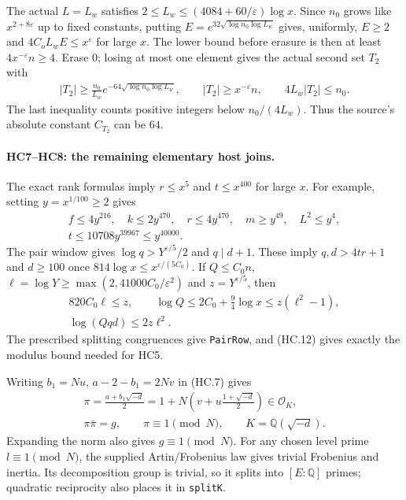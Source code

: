 The actual $L=L_w$ satisfies
$2\le L_w\le(4084+60/\varepsilon)\log x$.
Since $n_0$ grows like $x^{2+8\varepsilon}$ up to fixed constants,
putting $E=e^{32\sqrt{\log n_0\log L_w}}$ gives, uniformly,
$E\ge2$ and $4C_oL_wE\le x^\varepsilon$ for large $x$.
The lower bound before erasure is then at least
$4x^{-\varepsilon}n\ge4$. Erase $0$; losing at most one element
gives the actual second set $T_2$ with
\[
 \begin{gathered}
 |T_2|\ge\frac{n_0}{L_w}
       e^{-64\sqrt{\log n_0\log L_w}},\qquad
 |T_2|\ge x^{-\varepsilon}n,\qquad
 4L_w|T_2|\le n_0.
 \end{gathered}                                      \tag{HC.11}
\]
The last inequality counts positive integers below $n_0/(4L_w)$.
Thus the source's absolute constant $C_{T_2}$ can be $64$.

\paragraph{HC7--HC8: the remaining elementary host joins.}
The exact rank formulas imply $r\le x^5$ and $t\le x^{400}$
for large $x$. For example, setting $y=x^{1/100}\ge2$ gives
\[
 \begin{gathered}
 f\le4y^{216},\quad k\le2y^{470},\quad r\le4y^{470},
 \quad m\ge y^{49},\quad L^2\le y^4,\\
 t\le10708y^{39967}\le y^{40000}.
 \end{gathered}
\]
The pair window gives $\log q>Y^{\varepsilon/5}/2$ and $q\mid d+1$.
These imply $q,d>4tr+1$ and $d\ge100$ once
$814\log x\le x^{\varepsilon/(5C_0)}$.
If $Q\le C_0n$, $\ell=\log Y\ge\max(2,41000C_0/\varepsilon^2)$
and $z=Y^{\varepsilon/5}$, then
\[
 \begin{gathered}
 820C_0\ell\le z,\qquad
 \log Q\le2C_0+\tfrac94\log x\le z(\ell^2-1),\\
 \log(Qqd)\le2z\ell^2.
 \end{gathered}                                      \tag{HC.12}
\]
The prescribed splitting congruences give \texttt{PairRow}, and
(HC.12) gives exactly the modulus bound needed for HC5.

Writing $b_1=Nu$, $a-2-b_1=2Nv$ in (HC.7) gives
\[
 \begin{gathered}
 \pi=\frac{a+b_1\sqrt{-d}}2
    =1+N\left(v+u\frac{1+\sqrt{-d}}2\right)\in\mathcal O_K,\\
 \pi\bar\pi=g,\qquad \pi\equiv1\pmod N,
 \qquad K=\mathbb Q(\sqrt{-d}).
 \end{gathered}                                      \tag{HC.13}
\]
Expanding the norm also gives $g\equiv1\pmod N$.
For any chosen level prime $l\equiv1\pmod N$, the supplied
Artin/Frobenius law gives trivial Frobenius and inertia. Its
decomposition group is trivial, so it splits into $[E:\mathbb Q]$
primes; quadratic reciprocity also places it in \texttt{splitK}.


